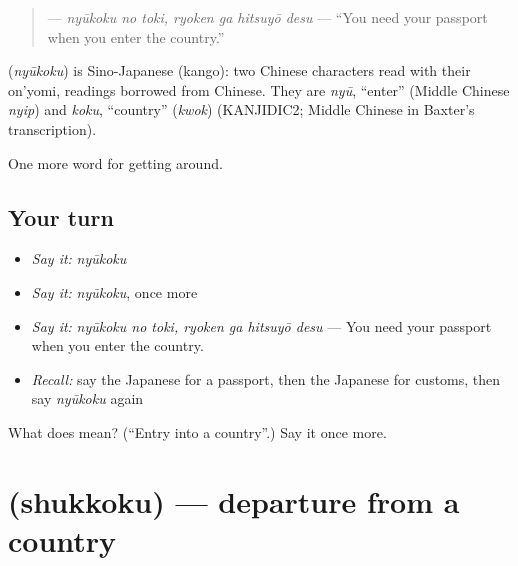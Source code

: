 \begin{quote}
\textbf{  } — \emph{nyūkoku no toki, ryoken ga hitsuyō desu} — \textquotedblleft{}You need your passport when you enter the country.\textquotedblright{}
\end{quote}

\begin{cousinweb}
\textbf{} (\emph{nyūkoku}) is Sino-Japanese (kango): two Chinese characters read with their on'yomi, readings borrowed from Chinese. They are \emph{nyū}, \textquotedblleft{}enter\textquotedblright{} (Middle Chinese \emph{nyip}) and \emph{koku}, \textquotedblleft{}country\textquotedblright{} (\emph{kwok}) (KANJIDIC2; Middle Chinese in Baxter's transcription).
\end{cousinweb}

\begin{grammarlens}[title={What you've built}]
One more word for getting around.
\end{grammarlens}

\subsection*{Your turn}
\begin{itemize}
\raggedright
  \item \emph{Say it:} \emph{nyūkoku}
  \item \emph{Say it:} \emph{nyūkoku}, once more
  \item \emph{Say it:} \emph{nyūkoku no toki, ryoken ga hitsuyō desu} — You need your passport when you enter the country.
  \item \emph{Recall:} say the Japanese for a passport, then the Japanese for customs, then say \emph{nyūkoku} again
\end{itemize}

\begin{tcolorbox}[breakable,colback=teal!4,colframe=teal!35!black,title={Before you move on}]
What does  mean? (\textquotedblleft{}Entry into a country\textquotedblright{}.) Say it once more.
\end{tcolorbox}
\section[\texorpdfstring{\ja{しゅっこく} (shukkoku)}{しゅっこく (shukkoku)}]{ (shukkoku) — departure from a country}

\label{lesson:JA-C386-shukkoku}



